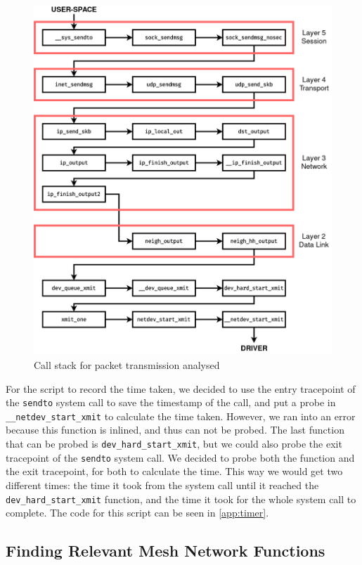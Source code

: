 \begin{figure}[htb]
   \centering
   \includegraphics[scale=.4]{callstack2}
   \caption{Call stack for packet transmission analysed}\label{fig:callstack}
\end{figure}

For the script to record the time taken, we decided to use the entry tracepoint
of the \texttt{sendto} system call to save the timestamp of the call, and put a
probe in \texttt{\_\_netdev\_start\_xmit} to calculate the time taken. However,
we ran into an error because this function is inlined, and thus can not be
probed. The last function that can be probed is \texttt{dev\_hard\_start\_xmit},
but we could also probe the exit tracepoint of the \texttt{sendto} system call.
We decided to probe both the function and the exit tracepoint, for both to
calculate the time. This way we would get two different times: the time it took
from the system call until it reached the \texttt{dev\_hard\_start\_xmit}
function, and the time it took for the whole system call to complete. The code
for this script can be seen in \autoref{app:timer}.


\subsection{Finding Relevant Mesh Network Functions}\label{subs:mesh}

